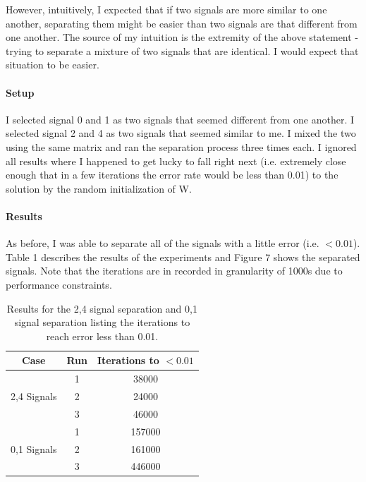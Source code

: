 \documentclass{article} %
\begin{document}
However, intuitively, I expected that if two signals are more similar to one another, separating them might be easier than two signals are that different from one another. The source of my intuition is the extremity of the above statement - trying to separate a mixture of two signals that are identical. I would expect that situation to be easier.

\paragraph{Setup}

I selected signal 0 and 1 as two signals that seemed different from one another. I selected signal 2 and 4 as two signals that seemed similar to me. I mixed the two using the same matrix and ran the separation process three times each. I ignored all results where I happened to get lucky to fall right next (i.e. extremely close enough that in a few iterations the error rate would be less than 0.01) to the solution by the random initialization of W.

\paragraph{Results}

As before, I was able to separate all of the signals with a little error (i.e. \(<0.01\)). Table 1 describes the results of the experiments and Figure 7 shows the separated signals. Note that the iterations are in recorded in granularity of 1000s due to performance constraints.

\begin{table}[H]
\centering
\begin{tabular}{|c|c|c|}
\hline
\textbf{Case} & \textbf{Run} & \textbf{Iterations to \(< 0.01\)} \\\hline
 & 1 & 38000 \\\cline{2-3} 
2,4 Signals & 2 & 24000 \\\cline{2-3}
 & 3 & 46000 \\\hline
 & 1 & 157000 \\\cline{2-3}
0,1 Signals & 2 & 161000 \\\cline{2-3}
 & 3 & 446000 \\\hline
\end{tabular}

\caption{\label{tab:widgets} Results for the 2,4 signal separation and 0,1 signal separation listing the iterations to reach error less than 0.01.}
\end{table}
\end{document}

